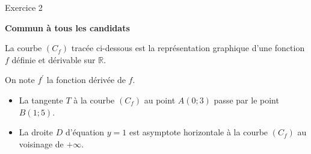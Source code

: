 
%
\begin{h2}Exercice 2\end{h2}
\textbf{Commun  à tous les candidats}
\par
La courbe $\left(C_{f}\right)$ tracée ci-dessous est la représentation graphique d'une fonction $f$ définie et dérivable sur $\mathbb{R}$.
\par
On note $f^{\prime}$ la fonction dérivée de $f$.
\begin{itemize}
     \item
     La tangente $T$ à la courbe $\left(C_{f}\right)$ au point $A\left(0 ; 3\right)$ passe par le point $B\left(1 ; 5\right)$.
     \item
     La droite $D$ d'équation $y=1$ est asymptote horizontale à la courbe $\left(C_{f}\right)$ au voisinage de $+\infty $.
\end{itemize}

